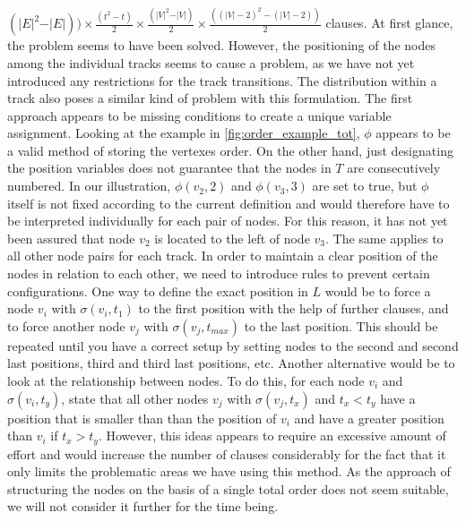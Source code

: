 \documentclass[bachelor, english]{algothesis}
\begin{document}
$ (\vert E \vert^2 - \vert E \vert)) \times \frac{(t^2-t)}{2} \times \frac{(\vert V \vert^2-\vert V \vert)}{2} \times \frac{((\vert V \vert-2)^2-(\vert V \vert-2))}{2}$ clauses.
\noindent \newline
At first glance, the problem seems to have been solved. However, the positioning of the nodes among the individual tracks seems to cause a problem, as we have not yet introduced any restrictions for the track transitions. The distribution within a track also poses a similar kind of problem with this formulation. The first approach appears to be missing conditions to create a unique variable assignment. Looking at the example in \cref{fig:order_example_tot}, $\phi$ appears to be a valid method of storing the vertexes order. On the other hand, just designating the position variables does not guarantee that the nodes in $T$ are consecutively numbered. In our illustration, $\phi(v_2,2)$ and $\phi(v_3,3)$ are set to true, but $\phi$ itself is not fixed according to the current definition and would therefore have to be interpreted individually for each pair of nodes. For this reason, it has not yet been assured that node $v_2$ is located to the left of node $v_3$.
The same applies to all other node pairs for each track. In order to maintain a clear position of the nodes in relation to each other, we need to introduce rules to prevent certain configurations. \newline
One way to define the exact position in $L$ would be to force a node $v_i$ with $\sigma(v_i,t_1)$ to the first position with the help of further clauses, and to force another node $v_j$ with $\sigma(v_j,t_{max})$ to the last position. This should be repeated until you have a correct setup by setting nodes to the second and second last positions, third and third last positions, etc. Another alternative would be to look at the relationship between nodes. To do this, for each node $v_i$ and $\sigma(v_i, t_y)$, state that all other nodes $v_j$ with $\sigma(v_j, t_x)$ and $t_x < t_y$ have a position that is smaller than than the position of $v_i$ and have a greater position than $v_i$ if $t_x > t_y$. However, this ideas appears to require an excessive amount of effort and would increase the number of clauses considerably for the fact that it only limits the problematic areas we have using this method. As the approach of structuring the nodes on the basis of a single total order does not seem suitable, we will not consider it further for the time being.
\end{document}
